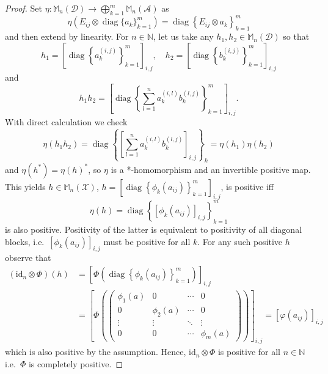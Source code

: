 \documentclass[reqno]{amsart}
\theoremstyle{plain}
\numberwithin{equation}{section}
\numberwithin{theorem}{section}
\numberwithin{lemma}{section}
\numberwithin{definition}{section}
\numberwithin{corollary}{section}
\numberwithin{remark}{section}
\newcommand{\naturals}{\mathbb{N}}
\newcommand{\id}[1]{\mathrm{id}_{#1}}
\newcommand{\hadj}{*}
\newcommand{\matra}[2]{\mathbb{M}_{#1}(#2)}
\begin{document}
\begin{proof}
Set $\eta : \matra{n}{\mathscr{D}}\to \bigoplus_{k=1}^{m}\matra{n}{\mathscr{A}}$ as
\begin{equation}\label{eq:EtaDef}
    \eta \left(E_{ij}\otimes\operatorname{diag}{\{a_k\}_{k=1}^{m}}\right) = \operatorname{diag}{\left\{E_{ij}\otimes a_k\right\}_{k=1}^{m}}
\end{equation}
and then extend by linearity. For $n\in\naturals$, let us take any $h_1, h_2 \in \matra{n}{\mathscr{D}}$ so that
\begin{equation}
    h_1 = \left[\operatorname{diag}{\left\{a^{(i,j)}_{k}\right\}_{k=1}^{m}}\right]_{i,j}, \quad h_2 = \left[\operatorname{diag}{\left\{b^{(i,j)}_{k}\right\}_{k=1}^{m}}\right]_{i,j}
\end{equation}
and
\begin{equation}
    h_1 h_2 = \left[\operatorname{diag}{\left\{\sum_{l=1}^{n}a^{(i,l)}_{k} b^{(l,j)}_{k}\right\}_{k=1}^{m}}\right]_{i,j}.
\end{equation}
With direct calculation we check
\begin{equation}
    \eta(h_1 h_2) = \operatorname{diag}{\left\{\left[\sum_{l=1}^{n}a^{(i,l)}_{k} b^{(l,j)}_{k}\right]_{i,j}\right\}}_{k} = \eta(h_1)\eta(h_2)
\end{equation}
and $\eta(h^\hadj) = \eta(h)^\hadj$, so $\eta$ is a *-homomorphism and an invertible positive map. This yields $h \in \matra{n}{\mathscr{X}}$, $h = \left[\operatorname{diag}{\left\{\phi_k (a_{ij})\right\}}_{k=1}^{m}\right]_{i,j}$, is positive iff
\begin{equation}
    \eta (h) = \operatorname{diag}{\left\{\left[\phi_k (a_{ij})\right]_{i,j}\right\}_{k=1}^{m}}
\end{equation}
is also positive. Positivity of the latter is equivalent to positivity of all diagonal blocks, i.e.~$\left[\phi_k (a_{ij})\right]_{i,j}$ must be positive for all $k$. For any such positive $h$ observe that
\begin{align}\label{eq:idnPhi}
    (\id{n}\otimes\Phi)(h) &= \left[\Phi(\operatorname{diag}{\left\{\phi_k (a_{ij})\right\}}_{k=1}^{m})\right]_{i,j} \\
    &= \left[\Phi\left(\left(\begin{array}{cccc}
        \phi_1(a) & 0 & \cdots & 0 \\
        0 & \phi_2(a) & \cdots & 0 \\
        \vdots & \vdots & \ddots & \vdots \\
        0 & 0 & \cdots & \phi_m(a)
    \end{array} \nonumber
\right)\right)\right]_{i,j} = \left[\varphi(a_{ij})\right]_{i,j}
\end{align}
which is also positive by the assumption. Hence, $\id{n}\otimes\Phi$ is positive for all $n\in\naturals$ i.e.~$\Phi$ is completely positive.
\end{proof}
\end{document}
